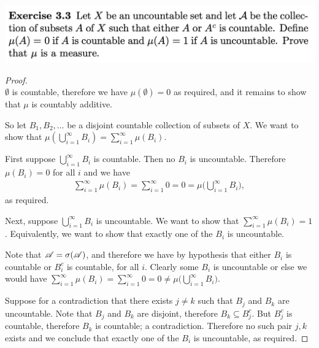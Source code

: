 \newpage
\begin{mdframed}
\includegraphics[width=400pt]{img/analysis--berkeley-202a-hw04-b168.png}
\end{mdframed}
\begin{proof}~\\
  $\emptyset$ is countable, therefore we have $\mu(\emptyset) = 0$ as required, and it remains to show
  that $\mu$ is countably additive.

  So let $B_1, B_2, \ldots$ be a disjoint countable collection of subsets of $X$. We want to show
  that $\mu(\bigcup_{i=1}^\infty B_i) = \sum_{i=1}^\infty \mu(B_i)$.


  First suppose $\bigcup_{i=1}^\infty B_i$ is countable. Then no $B_i$ is uncountable. Therefore $\mu(B_i) = 0$
  for all $i$ and we have
  \begin{align*}
    \sum_{i=1}^\infty \mu(B_i) = \sum_{i=1}^\infty 0 = 0 = \mu\big(\bigcup_{i=1}^\infty B_i\big),
  \end{align*}
  as required.

  Next, suppose $\bigcup_{i=1}^\infty B_i$ is uncountable. We want to show
  that $\sum_{i=1}^\infty \mu(B_i) = 1$. Equivalently, we want to show that exactly one of the $B_i$ is
  uncountable.

  Note that $\mathscr A = \sigma(\mathscr A)$, and therefore we have by hypothesis that either $B_i$ is countable
  or $B_i^c$ is countable, for all $i$. Clearly some $B_i$ is uncountable or else we would
  have $\sum_{i=1}^\infty \mu(B_i) = \sum_{i=1}^\infty 0 = 0 \neq \mu\big(\bigcup_{i=1}^\infty B_i\big)$.

  Suppose for a contradiction that there exists $j \neq k$ such that $B_j$ and $B_k$ are uncountable. Note
  that $B_j$ and $B_k$ are disjoint, therefore $B_k \subseteq B_j^c$. But $B_j^c$ is countable, therefore $B_k$
  is countable; a contradiction. Therefore no such pair $j, k$ exists and we conclude that exactly one of
  the $B_i$ is uncountable, as required.
\end{proof}

